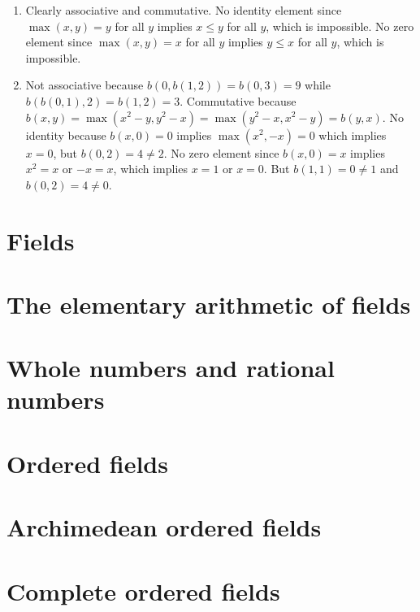 \begin{solution}
\begin{enumerate}[label=(\alph*)]
    \item Clearly associative and commutative. No identity element since $\max(x,y)=y$ for all $y$
    implies $x\leq y$ for all $y$, which is impossible.
    No zero element since $\max(x,y)=x$ for all $y$ implies $y\leq x$ for all $y$, which is impossible. 

    \item Not associative because $b(0,b(1,2))=b(0,3)=9$ while $b(b(0,1),2)=b(1,2)=3$.
    Commutative because $b(x,y)=\max(x^2-y,y^2-x)=\max(y^2-x,x^2-y)=b(y,x)$.
    No identity because $b(x,0)=0$ implies $\max(x^2,-x)=0$ which implies $x=0$, but $b(0,2)=4\neq 2$.
    No zero element since $b(x,0)=x$ implies $x^2=x$ or $-x=x$, which implies $x=1$ or $x=0$.
    But $b(1,1)=0\neq 1$ and $b(0,2)=4\neq 0$.
\end{enumerate}
\end{solution}

\section{Fields}


\section{The elementary arithmetic of fields}
\section{Whole numbers and rational numbers}
\section{Ordered fields}
\section{Archimedean ordered fields}
\section{Complete ordered fields}

